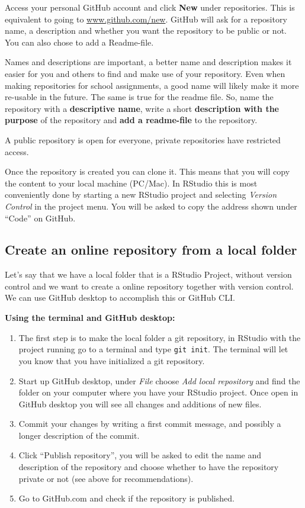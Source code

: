 \documentclass[
  11pt,
  letterpaper,
]{scrbook}
\providecommand{\tightlist}{%
  \setlength{\itemsep}{0pt}\setlength{\parskip}{0pt}}\usepackage{longtable,booktabs,array}
\begin{document}
Access your personal GitHub account and click \textbf{New} under
repositories. This is equivalent to going to \url{www.github.com/new}.
GitHub will ask for a repository name, a description and whether you
want the repository to be public or not. You can also chose to add a
Readme-file.

Names and descriptions are important, a better name and description
makes it easier for you and others to find and make use of your
repository. Even when making repositories for school assignments, a good
name will likely make it more re-usable in the future. The same is true
for the readme file. So, name the repository with a \textbf{descriptive
name}, write a short \textbf{description with the purpose} of the
repository and \textbf{add a readme-file} to the repository.

A public repository is open for everyone, private repositories have
restricted access.

Once the repository is created you can clone it. This means that you
will copy the content to your local machine (PC/Mac). In RStudio this is
most conveniently done by starting a new RStudio project and selecting
\emph{Version Control} in the project menu. You will be asked to copy
the address shown under ``Code'' on GitHub.

\hypertarget{create-an-online-repository-from-a-local-folder}{%
\subsection{Create an online repository from a local
folder}\label{create-an-online-repository-from-a-local-folder}}

Let's say that we have a local folder that is a RStudio Project, without
version control and we want to create a online repository together with
version control. We can use GitHub desktop to accomplish this or GitHub
CLI.

\textbf{Using the terminal and GitHub desktop:}

\begin{enumerate}
\def\labelenumi{\arabic{enumi}.}
\tightlist
\item
  The first step is to make the local folder a git repository, in
  RStudio with the project running go to a terminal and type
  \texttt{git\ init}. The terminal will let you know that you have
  initialized a git repository.
\item
  Start up GitHub desktop, under \emph{File} choose \emph{Add local
  repository} and find the folder on your computer where you have your
  RStudio project. Once open in GitHub desktop you will see all changes
  and additions of new files.
\item
  Commit your changes by writing a first commit message, and possibly a
  longer description of the commit.
\item
  Click ``Publish repository'', you will be asked to edit the name and
  description of the repository and choose whether to have the
  repository private or not (see above for recommendations).
\item
  Go to GitHub.com and check if the repository is published.
\end{enumerate}
\end{document}
